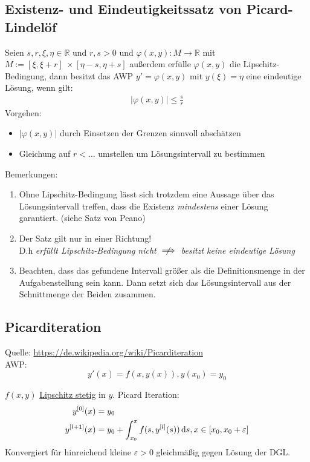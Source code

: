 \subsection{Existenz- und Eindeutigkeitssatz von Picard-Lindelöf}
 Seien ${s,r,\xi,\eta \in \mathbb{R}}$ und $r,s > 0$ und ${\varphi(x,y):M \to \mathbb{R}}$ mit ${M:= [ \xi,\xi +r] \ \times [\eta-s,\eta+s]}$ außerdem erfülle $\varphi(x,y)$ die Lipschitz-Bedingung, dann besitzt das AWP ${y'=\varphi(x,y)}$ mit $y(\xi)=\eta$ eine eindeutige Lösung, wenn gilt: \\
 \begin{align*}
     |\varphi(x,y)|\leq \frac{s}{r}
 \end{align*}
 Vorgehen:
 \begin{itemize}
     \item $|\varphi(x,y)|$ durch Einsetzen der Grenzen sinnvoll abschätzen
     \item Gleichung auf $r<\dots$ umstellen um Lösungsintervall zu bestimmen
 \end{itemize}
Bemerkungen:
\begin{enumerate}
    \item Ohne Lipschitz-Bedingung lässt sich trotzdem eine Aussage über das Lösungsintervall treffen, dass die Existenz \textit{mindestens} einer Lösung garantiert. (siehe Satz von Peano)
    \item Der Satz gilt nur in einer Richtung!\\ D.h  \textit{erfüllt Lipschitz-Bedingung nicht} $\centernot\implies$  \textit{besitzt keine eindeutige Lösung}
    \item Beachten, dass das gefundene Intervall größer als die Definitionsmenge in der Aufgabenstellung sein kann. Dann setzt sich das Lösungsintervall aus der Schnittmenge der Beiden zusammen.
\end{enumerate}


\subsection{Picarditeration}

Quelle: \url{https://de.wikipedia.org/wiki/Picarditeration}\\
AWP:
\begin{equation*}
    y'(x) = f(x, y(x)), y(x_0) = y_0
\end{equation*}

$f(x, y)$ \hyperref[subsec:l-stetig]{Lipschitz stetig} in $y$. Picard Iteration:
\begin{align*}
    y^{[0]}(x) &= y_0\\
    y^{[l+1]}(x) &= y_0 + \int_{x_0}^x f(s,y^{[l]}(s)) \mathop{}\!\mathrm{d} s, x \in [x_0, x_0 + \varepsilon]
\end{align*}
Konvergiert für hinreichend kleine $\varepsilon > 0$ gleichmäßig gegen Lösung der DGL.


